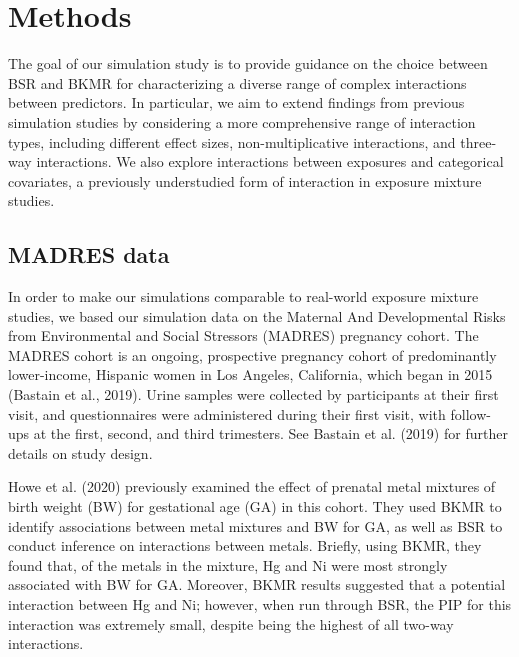 \documentclass[12pt, twoside]{amherstthesis}
\begin{document}
\hypertarget{methods}{%
\section{Methods}\label{methods}}

The goal of our simulation study is to provide guidance on the choice between BSR and BKMR for characterizing a diverse range of complex interactions between predictors. In particular, we aim to extend findings from previous simulation studies by considering a more comprehensive range of interaction types, including different effect sizes, non-multiplicative interactions, and three-way interactions. We also explore interactions between exposures and categorical covariates, a previously understudied form of interaction in exposure mixture studies.

\hypertarget{madres}{%
\subsection{MADRES data}\label{madres}}

In order to make our simulations comparable to real-world exposure mixture studies, we based our simulation data on the Maternal And Developmental Risks from Environmental and Social Stressors (MADRES) pregnancy cohort. The MADRES cohort is an ongoing, prospective pregnancy cohort of predominantly lower-income, Hispanic women in Los Angeles, California, which began in 2015 (Bastain et al., 2019). Urine samples were collected by participants at their first visit, and questionnaires were administered during their first visit, with follow-ups at the first, second, and third trimesters. See Bastain et al. (2019) for further details on study design.

Howe et al. (2020) previously examined the effect of prenatal metal mixtures of birth weight (BW) for gestational age (GA) in this cohort. They used BKMR to identify associations between metal mixtures and BW for GA, as well as BSR to conduct inference on interactions between metals. Briefly, using BKMR, they found that, of the metals in the mixture, Hg and Ni were most strongly associated with BW for GA. Moreover, BKMR results suggested that a potential interaction between Hg and Ni; however, when run through BSR, the PIP for this interaction was extremely small, despite being the highest of all two-way interactions.
\end{document}
